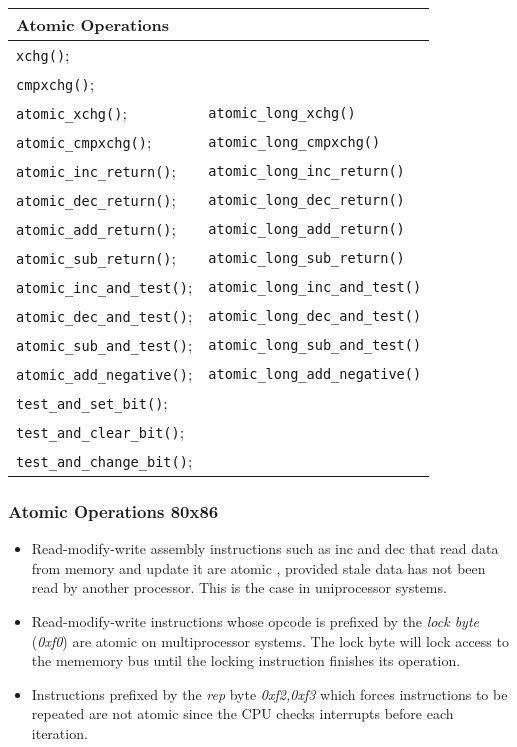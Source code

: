 \documentclass{article}
\begin{document}
\begin{center}
  \begin{tabular}{ l | l }    
    \hline
    Atomic Operations &  \\ \hline
    \lstinline{xchg()}; & \\
    \lstinline{cmpxchg()}; & \\
    \lstinline{atomic_xchg()}; &			\lstinline{atomic_long_xchg()} \\
    \lstinline{atomic_cmpxchg()}; &		        \lstinline{atomic_long_cmpxchg()} \\
    \lstinline{atomic_inc_return()}; &		        \lstinline{atomic_long_inc_return()} \\
    \lstinline{atomic_dec_return()}; &		        \lstinline{atomic_long_dec_return()} \\
    \lstinline{atomic_add_return()}; &		        \lstinline{atomic_long_add_return()} \\
    \lstinline{atomic_sub_return()}; &		        \lstinline{atomic_long_sub_return()} \\
    \lstinline{atomic_inc_and_test()}; &		\lstinline{atomic_long_inc_and_test()} \\
    \lstinline{atomic_dec_and_test()}; &		\lstinline{atomic_long_dec_and_test()} \\
    \lstinline{atomic_sub_and_test()}; &		\lstinline{atomic_long_sub_and_test()} \\
    \lstinline{atomic_add_negative()}; &		\lstinline{atomic_long_add_negative()} \\
    \lstinline{test_and_set_bit()}; & \\
    \lstinline{test_and_clear_bit()}; & \\
    \lstinline{test_and_change_bit()}; &     \\
    \hline
  \end{tabular}
\end{center}


\subsubsection{Atomic Operations 80x86}

\begin{itemize}
  \item Read-modify-write assembly instructions such as inc and dec
    that read data from memory and update it are atomic , provided
    stale data has not been read by another processor. This is the
    case in uniprocessor systems.

  \item Read-modify-write instructions whose opcode is prefixed by the
    \emph{lock byte} (\emph{0xf0}) are atomic on multiprocessor
    systems.  The lock byte will lock access to the mememory bus until
    the locking instruction finishes its operation.
  \item Instructions prefixed by the \emph{rep} byte \emph{0xf2,0xf3}
    which forces instructions to be repeated are not atomic since the
    CPU checks interrupts before each iteration.

\end{itemize}
\end{document}
